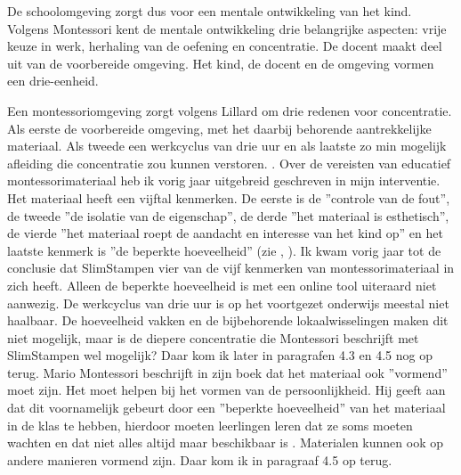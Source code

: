 \documentclass[12pt, a4paper]{article}
\begin{document}
De schoolomgeving zorgt dus voor een mentale ontwikkeling van het kind. Volgens Montessori kent de mentale ontwikkeling drie belangrijke aspecten: vrije keuze in werk, herhaling van de oefening en concentratie. \cite[p.202]{Montessori2020}
De docent maakt deel uit van de voorbereide omgeving. Het kind, de docent en de omgeving vormen een drie-eenheid.

Een montessoriomgeving zorgt volgens Lillard om drie redenen voor concentratie. Als eerste de voorbereide omgeving, met het daarbij behorende aantrekkelijke materiaal. Als tweede een werkcyclus van drie uur en als laatste zo min mogelijk afleiding die concentratie zou kunnen verstoren. \cite[p.122-123]{Lillard}. Over de vereisten van educatief montessorimateriaal heb ik vorig jaar uitgebreid geschreven in mijn interventie. Het materiaal heeft een vijftal kenmerken. De eerste is de ''controle van de fout'', de tweede ''de isolatie van de eigenschap'', de derde ''het materiaal is esthetisch'', de vierde ''het materiaal roept de aandacht en interesse van het kind op'' en het laatste kenmerk is ''de beperkte hoeveelheid'' (zie \cite[]{Marijn23}, \cite[]{Montessori2017}). Ik kwam vorig jaar tot de conclusie dat SlimStampen vier van de vijf kenmerken van montessorimateriaal in zich heeft. Alleen de beperkte hoeveelheid is met een online tool uiteraard niet aanwezig. De werkcyclus van drie uur is op het voortgezet onderwijs meestal niet haalbaar. De hoeveelheid vakken en de bijbehorende lokaalwisselingen maken dit niet mogelijk, maar is de diepere concentratie die Montessori beschrijft met SlimStampen wel mogelijk? Daar kom ik later in paragrafen 4.3 en 4.5 nog op terug.
Mario Montessori beschrijft in zijn boek dat het materiaal ook ''vormend'' moet zijn. Het moet helpen bij het vormen van de persoonlijkheid. Hij geeft aan dat dit voornamelijk gebeurt door een ''beperkte hoeveelheid'' van het materiaal in de klas te hebben, hierdoor moeten leerlingen leren dat ze soms moeten wachten en dat niet alles altijd maar beschikbaar is \cite[p.88]{Mario}. Materialen kunnen ook op andere manieren vormend zijn. Daar kom ik in paragraaf 4.5 op terug.
\end{document}

